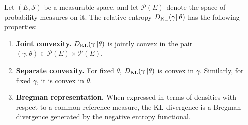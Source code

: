 \documentclass[12pt,a4paper,oneside]{book}
\begin{document}
\begin{theorem}
\label{thm:kl-joint-convexity}
\label{src:p11q4}

Let $(E,\mathcal S)$ be a measurable space, and let $\mathcal P(E)$ denote the space of probability measures on it. The
relative entropy $D_{\mathrm{KL}}(\gamma\Vert\theta)$ has the following properties:

\begin{enumerate}
    \item \textbf{Joint convexity.} $D_{\mathrm{KL}}(\gamma\Vert\theta)$ is jointly convex in the pair $(\gamma,\theta)\in\mathcal P(E)\times\mathcal P(E)$.

    \item \textbf{Separate convexity.} For fixed $\theta$, $D_{\mathrm{KL}}(\gamma\Vert\theta)$ is convex in $\gamma$. Similarly, for
        fixed $\gamma$, it is convex in $\theta$.

    \item \textbf{Bregman representation.} When expressed in terms of densities with respect to a common reference measure,
        the KL divergence is a Bregman divergence generated by the negative entropy functional.
\end{enumerate}
\end{theorem}
\end{document}
